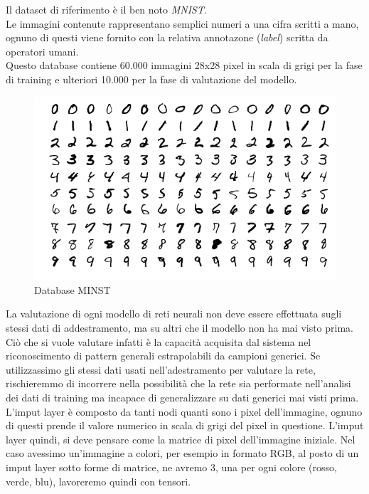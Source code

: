 \documentclass[12pt,a4paper,openright,twoside]{report}
\begin{document}
Il dataset di riferimento è il ben noto \emph{MNIST}.\\
Le immagini contenute rappresentano semplici numeri a una cifra scritti a mano, ognuno di questi viene fornito con la relativa annotazone (\emph{label}) scritta da operatori umani.\\
Questo database contiene 60.000 immagini 28x28 pixel in scala di grigi per la fase di training e ulteriori 10.000 per la fase di valutazione del modello. \\
\begin{figure}[h]
\centering
\includegraphics[width=\linewidth]{minst.png}
\caption{Database MINST}
\end{figure}
La valutazione di ogni modello di reti neurali non deve essere effettuata sugli stessi dati di addestramento, ma su altri che il modello non ha mai visto prima. Ciò che si vuole valutare infatti è la capacità acquisita dal sistema nel riconoscimento di pattern generali estrapolabili da campioni generici. Se utilizzassimo gli stessi dati usati nell'adestramento per valutare la rete, rischieremmo di incorrere nella possibilità che la rete sia performate nell'analisi dei dati di training ma incapace di generalizzare su dati generici mai visti prima.   \\
\newpage
L'imput layer è composto da tanti nodi quanti sono i pixel dell'immagine, ognuno di questi prende il valore numerico in scala di grigi del pixel in questione.
L'imput layer quindi, si deve pensare come la matrice di pixel dell'immagine iniziale. Nel caso avessimo un'immagine a colori, per esempio in formato RGB, al posto di un imput layer sotto forme di matrice, ne avremo 3, una per ogni colore (rosso, verde, blu), lavoreremo quindi con tensori.\\
\newpage
\end{document}
